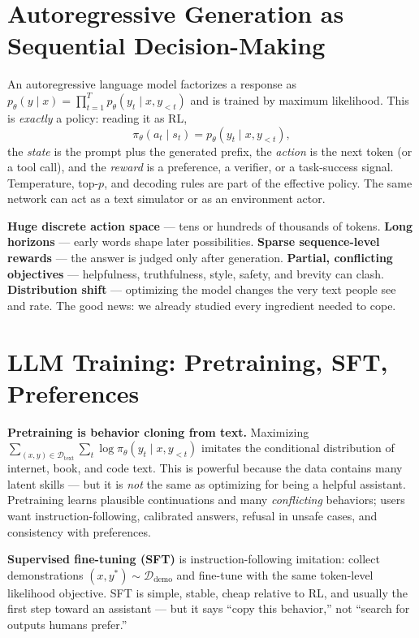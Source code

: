 \documentclass[11pt, oneside]{book}
\newcommand{\dataset}{\mathcal{D}}       %
\begin{document}
\section{Autoregressive Generation as Sequential Decision-Making}

An autoregressive language model factorizes a response as
$p_\theta(y\mid x) = \prod_{t=1}^T p_\theta(y_t\mid x, y_{<t})$ and is trained by maximum
likelihood. This is \emph{exactly} a policy: reading it as RL,
\[
  \pi_\theta(a_t\mid s_t) = p_\theta(y_t\mid x, y_{<t}),
\]
the \emph{state} is the prompt plus the generated prefix, the \emph{action} is the next
token (or a tool call), and the \emph{reward} is a preference, a verifier, or a task-success
signal. Temperature, top-$p$, and decoding rules are part of the effective policy. The same
network can act as a text simulator or as an environment actor.

\begin{notebox}[title={What makes language RL difficult}]
\textbf{Huge discrete action space} --- tens or hundreds of thousands of tokens.
\textbf{Long horizons} --- early words shape later possibilities.
\textbf{Sparse sequence-level rewards} --- the answer is judged only after generation.
\textbf{Partial, conflicting objectives} --- helpfulness, truthfulness, style, safety, and
brevity can clash.
\textbf{Distribution shift} --- optimizing the model changes the very text people see and
rate. The good news: we already studied every ingredient needed to cope.
\end{notebox}

\section{LLM Training: Pretraining, SFT, Preferences}

\textbf{Pretraining is behavior cloning from text.} Maximizing
$\sum_{(x,y)\in\dataset_{\text{text}}} \sum_t \log \pi_\theta(y_t\mid x, y_{<t})$ imitates
the conditional distribution of internet, book, and code text. This is powerful because the
data contains many latent skills --- but it is \emph{not} the same as optimizing for being a
helpful assistant. Pretraining learns plausible continuations and many \emph{conflicting}
behaviors; users want instruction-following, calibrated answers, refusal in unsafe cases,
and consistency with preferences.

\textbf{Supervised fine-tuning (SFT)} is instruction-following imitation: collect
demonstrations $(x, y^*)\sim\dataset_{\text{demo}}$ and fine-tune with the same token-level
likelihood objective. SFT is simple, stable, cheap relative to RL, and usually the first
step toward an assistant --- but it says ``copy this behavior,'' not ``search for outputs
humans prefer.''
\end{document}
